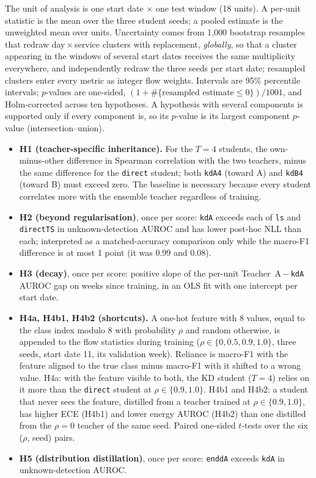 \documentclass[journal]{IEEEtran}
\newcommand{\kd}[1]{\texttt{#1}}
\begin{document}
The unit of analysis is one start date $\times$ one test window (18 units). A per-unit statistic is the mean over the three student seeds; a pooled estimate is the unweighted mean over units. Uncertainty comes from 1,000 bootstrap resamples that redraw day\,$\times$\,service clusters with replacement, \emph{globally}, so that a cluster appearing in the windows of several start dates receives the same multiplicity everywhere, and independently redraw the three seeds per start date; resampled clusters enter every metric as integer flow weights. Intervals are 95\% percentile intervals; $p$-values are one-sided, $(1+\#\{\text{resampled estimate}\le 0\})/1001$, and Holm-corrected across ten hypotheses. A hypothesis with several components is supported only if every component is, so its $p$-value is its largest component $p$-value (intersection--union).

\begin{itemize}
\item \textbf{H1 (teacher-specific inheritance).} For the $T=4$ students, the own-minus-other difference in Spearman correlation with the two teachers, minus the same difference for the \kd{direct} student; both \kd{kdA4} (toward A) and \kd{kdB4} (toward B) must exceed zero. The baseline is necessary because every student correlates more with the ensemble teacher regardless of training.
\item \textbf{H2 (beyond regularisation)}, once per score: \kd{kdA} exceeds each of \kd{ls} and \kd{directTS} in unknown-detection AUROC and has lower post-hoc NLL than each; interpreted as a matched-accuracy comparison only while the macro-F1 difference is at most 1 point (it was 0.99 and 0.08).
\item \textbf{H3 (decay)}, once per score: positive slope of the per-unit Teacher~A\,$-$\,\kd{kdA} AUROC gap on weeks since training, in an OLS fit with one intercept per start date.
\item \textbf{H4a, H4b1, H4b2 (shortcuts).} A one-hot feature with 8 values, equal to the class index modulo 8 with probability $\rho$ and random otherwise, is appended to the flow statistics during training ($\rho\in\{0,0.5,0.9,1.0\}$, three seeds, start date 11, its validation week). Reliance is macro-F1 with the feature aligned to the true class minus macro-F1 with it shifted to a wrong value. H4a: with the feature visible to both, the KD student ($T=4$) relies on it more than the \kd{direct} student at $\rho\in\{0.9,1.0\}$. H4b1 and H4b2: a student that never sees the feature, distilled from a teacher trained at $\rho\in\{0.9,1.0\}$, has higher ECE (H4b1) and lower energy AUROC (H4b2) than one distilled from the $\rho=0$ teacher of the same seed. Paired one-sided $t$-tests over the six ($\rho$, seed) pairs.
\item \textbf{H5 (distribution distillation)}, once per score: \kd{enddA} exceeds \kd{kdA} in unknown-detection AUROC.
\end{itemize}
\end{document}
